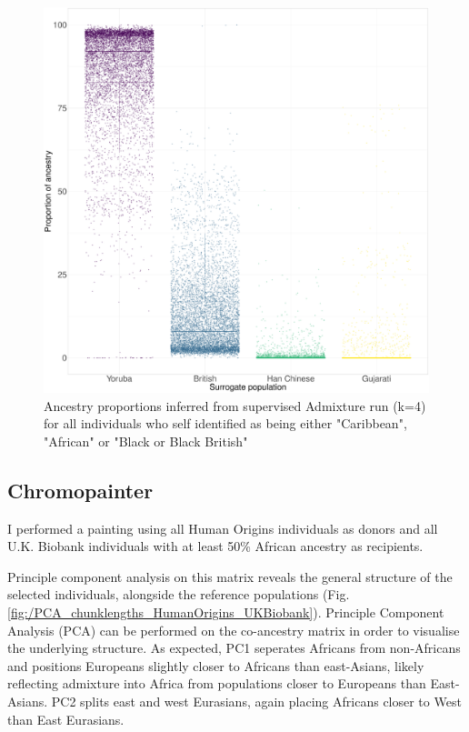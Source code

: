 \begin{figure}[htp]
    \centering
    \includegraphics[width=1.0\textwidth]{../images/chapter3/African_Inds_proportions.pdf}
    \caption{Ancestry proportions inferred from supervised Admixture run (k=4) for all individuals who self identified as being either "Caribbean", "African" or "Black or Black British"}
    \label{fig:African_Inds_proportions_ADMIXTURE}
\end{figure}


\subsection{Chromopainter}

I performed a painting using all Human Origins individuals as donors and all U.K. Biobank individuals with at least 50\% African ancestry as recipients. 

Principle component analysis on this matrix reveals the general structure of the selected individuals, alongside the reference populations (Fig. \ref{fig:/PCA_chunklengths_HumanOrigins_UKBiobank}). Principle Component Analysis (PCA) can be performed on the co-ancestry matrix in order to visualise the underlying structure. As expected, PC1 seperates Africans from non-Africans and positions Europeans slightly closer to Africans than east-Asians, likely reflecting admixture into Africa from populations closer to Europeans than East-Asians. PC2 splits east and west Eurasians, again placing Africans closer to West than East Eurasians. 


